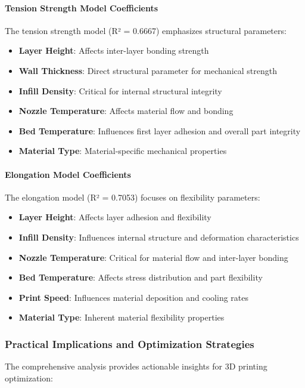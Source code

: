 \paragraph{Tension Strength Model Coefficients}
The tension strength model (R² = 0.6667) emphasizes structural parameters:
\begin{itemize}
    \item \textbf{Layer Height}: Affects inter-layer bonding strength
    \item \textbf{Wall Thickness}: Direct structural parameter for mechanical strength
    \item \textbf{Infill Density}: Critical for internal structural integrity
    \item \textbf{Nozzle Temperature}: Affects material flow and bonding
    \item \textbf{Bed Temperature}: Influences first layer adhesion and overall part integrity
    \item \textbf{Material Type}: Material-specific mechanical properties
\end{itemize}

\paragraph{Elongation Model Coefficients}
The elongation model (R² = 0.7053) focuses on flexibility parameters:
\begin{itemize}
    \item \textbf{Layer Height}: Affects layer adhesion and flexibility
    \item \textbf{Infill Density}: Influences internal structure and deformation characteristics
    \item \textbf{Nozzle Temperature}: Critical for material flow and inter-layer bonding
    \item \textbf{Bed Temperature}: Affects stress distribution and part flexibility
    \item \textbf{Print Speed}: Influences material deposition and cooling rates
    \item \textbf{Material Type}: Inherent material flexibility properties
\end{itemize}

\subsubsection{Practical Implications and Optimization Strategies}

The comprehensive analysis provides actionable insights for 3D printing optimization:

